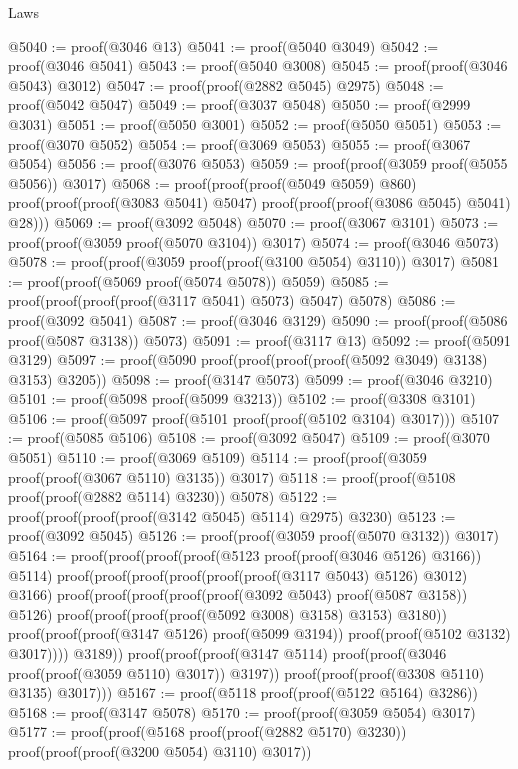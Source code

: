 \begin{lexlean}{Laws}
\begin{coremodule}
@5040 := proof(@3046 @13)
@5041 := proof(@5040 @3049)
@5042 := proof(@3046 @5041)
@5043 := proof(@5040 @3008)
@5045 := proof(proof(@3046 @5043) @3012)
@5047 := proof(proof(@2882 @5045) @2975)
@5048 := proof(@5042 @5047)
@5049 := proof(@3037 @5048)
@5050 := proof(@2999 @3031)
@5051 := proof(@5050 @3001)
@5052 := proof(@5050 @5051)
@5053 := proof(@3070 @5052)
@5054 := proof(@3069 @5053)
@5055 := proof(@3067 @5054)
@5056 := proof(@3076 @5053)
@5059 := proof(proof(@3059 proof(@5055 @5056)) @3017)
@5068 := proof(proof(proof(@5049 @5059) @860)
      proof(proof(proof(@3083 @5041) @5047) proof(proof(proof(@3086 @5045) @5041) @28)))
@5069 := proof(@3092 @5048)
@5070 := proof(@3067 @3101)
@5073 := proof(proof(@3059 proof(@5070 @3104)) @3017)
@5074 := proof(@3046 @5073)
@5078 := proof(proof(@3059 proof(proof(@3100 @5054) @3110)) @3017)
@5081 := proof(proof(@5069 proof(@5074 @5078)) @5059)
@5085 := proof(proof(proof(proof(@3117 @5041) @5073) @5047) @5078)
@5086 := proof(@3092 @5041)
@5087 := proof(@3046 @3129)
@5090 := proof(proof(@5086 proof(@5087 @3138)) @5073)
@5091 := proof(@3117 @13)
@5092 := proof(@5091 @3129)
@5097 := proof(@5090 proof(proof(proof(proof(@5092 @3049) @3138) @3153) @3205))
@5098 := proof(@3147 @5073)
@5099 := proof(@3046 @3210)
@5101 := proof(@5098 proof(@5099 @3213))
@5102 := proof(@3308 @3101)
@5106 := proof(@5097 proof(@5101 proof(proof(@5102 @3104) @3017)))
@5107 := proof(@5085 @5106)
@5108 := proof(@3092 @5047)
@5109 := proof(@3070 @5051)
@5110 := proof(@3069 @5109)
@5114 := proof(proof(@3059 proof(proof(@3067 @5110) @3135)) @3017)
@5118 := proof(proof(@5108 proof(proof(@2882 @5114) @3230)) @5078)
@5122 := proof(proof(proof(proof(@3142 @5045) @5114) @2975) @3230)
@5123 := proof(@3092 @5045)
@5126 := proof(proof(@3059 proof(@5070 @3132)) @3017)
@5164 := proof(proof(proof(proof(@5123 proof(proof(@3046 @5126) @3166)) @5114)
        proof(proof(proof(proof(proof(proof(@3117 @5043) @5126) @3012) @3166)
              proof(proof(proof(proof(proof(@3092 @5043) proof(@5087 @3158)) @5126)
                    proof(proof(proof(proof(@5092 @3008) @3158) @3153) @3180))
                  proof(proof(proof(@3147 @5126) proof(@5099 @3194))
                      proof(proof(@5102 @3132) @3017))))
            @3189))
      proof(proof(proof(@3147 @5114) proof(proof(@3046 proof(proof(@3059 @5110) @3017)) @3197))
          proof(proof(proof(@3308 @5110) @3135) @3017)))
@5167 := proof(@5118 proof(proof(@5122 @5164) @3286))
@5168 := proof(@3147 @5078)
@5170 := proof(proof(@3059 @5054) @3017)
@5177 := proof(proof(@5168 proof(proof(@2882 @5170) @3230))
      proof(proof(proof(@3200 @5054) @3110) @3017))

\end{coremodule}
\end{lexlean}
